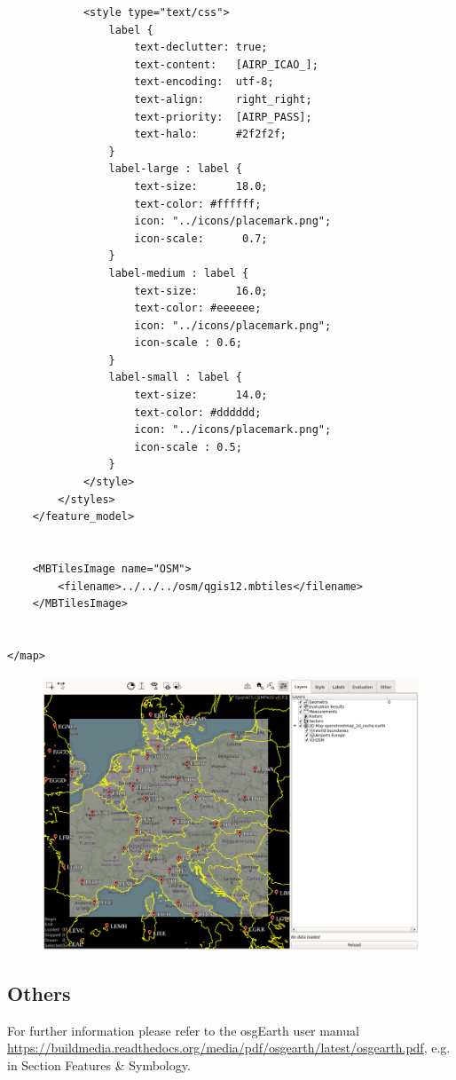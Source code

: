 \begin{lstlisting}
            <style type="text/css">   
                label {
                    text-declutter: true;
                    text-content:   [AIRP_ICAO_];
                    text-encoding:  utf-8;
                    text-align:     right_right;
                    text-priority:  [AIRP_PASS];
                    text-halo:      #2f2f2f;
                }                
                label-large : label {
                    text-size:      18.0;
                    text-color: #ffffff;
                    icon: "../icons/placemark.png";
                    icon-scale:      0.7;
                }
                label-medium : label {
                    text-size:      16.0;
                    text-color: #eeeeee;
                    icon: "../icons/placemark.png";
                    icon-scale : 0.6;
                }           
                label-small : label {
                    text-size:      14.0;
                    text-color: #dddddd;
                    icon: "../icons/placemark.png";
                    icon-scale : 0.5;
                }
            </style>
        </styles>
    </feature_model>
    
    
    <MBTilesImage name="OSM">
        <filename>../../../osm/qgis12.mbtiles</filename>
    </MBTilesImage>

    
</map>

\end{lstlisting}

\begin{figure}[H]
    \hspace*{-2.5cm}
    \includegraphics[width=19cm,frame]{figures/geoview_qgis_osm2.png}
\end{figure}

 
\subsection{Others}

For further information please refer to the osgEarth user manual \url{https://buildmedia.readthedocs.org/media/pdf/osgearth/latest/osgearth.pdf}, e.g. in Section Features \& Symbology.
 
